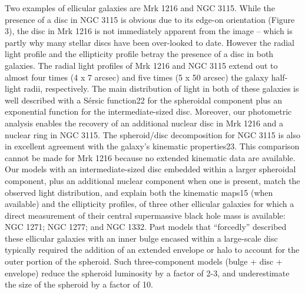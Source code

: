 \documentclass[useAMS,usenatbib,article]{mn2e}
\begin{document}
Two examples of ellicular galaxies are Mrk 1216 and NGC 3115. 
While the presence of a disc in NGC 3115 is obvious due to its edge-on orientation (Figure 3), 
the disc in Mrk 1216 is not immediately apparent from the image 
-- which is partly why many stellar discs have been over-looked to date. 
However the radial light profile and the ellipticity profile betray the presence of a disc in both galaxies. 
The radial light profiles of Mrk 1216 and NGC 3115 extend out to almost four times (4 x 7 arcsec) 
and five times (5 x 50 arcsec) the galaxy half-light radii, respectively. 
The main distribution of light in both of these galaxies is well described with a S\'ersic function22 
for the spheroidal component plus an exponential function for the intermediate-sized disc. 
Moreover, our photometric analysis enables the recovery of an additional nuclear disc in Mrk 1216 
and a nuclear ring in NGC 3115. 
The spheroid/disc decomposition for NGC 3115 is also in excellent agreement with the galaxy's kinematic properties23. 
This comparison cannot be made for Mrk 1216 because no extended kinematic data are available.  
Our models with an intermediate-sized disc embedded within a larger spheroidal component, 
plus an additional nuclear component when one is present, 
match the observed light distribution, and explain both the kinematic maps15 (when available) 
and the ellipticity profiles, of three other ellicular galaxies 
for which a direct measurement of their central supermassive black hole mass is available: 
NGC 1271; NGC 1277; and NGC 1332.  
Past models that ``forcedly'' described these ellicular galaxies with an inner bulge 
encased within a large-scale disc 
typically required the addition of an extended envelope or halo to account for the outer portion of the spheroid. 
Such three-component models (bulge + disc + envelope) reduce the spheroid luminosity by a factor of 2-3, 
and underestimate the size of the spheroid by a factor of 10.
\end{document}
